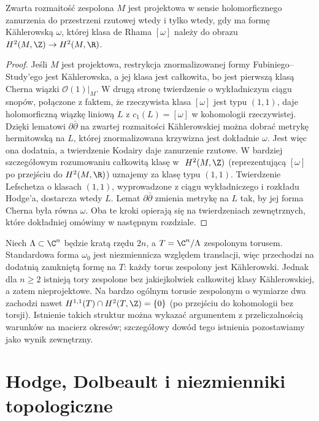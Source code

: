 \begin{wniosek}
\label{wn:ga9-integral-kahler}
Zwarta rozmaitość zespolona $M$ jest projektowa
w sensie holomorficznego zanurzenia do przestrzeni
rzutowej wtedy i tylko wtedy, gdy ma formę Kählerowską
$\omega$, której klasa de Rhama $[\omega]$ należy
do obrazu $H^2(M,\Z)\to H^2(M,\R)$.
\end{wniosek}
\begin{proof}
Jeśli $M$ jest projektowa, restrykcja znormalizowanej
formy Fubiniego--Study'ego jest Kählerowska, a jej
klasa jest całkowita, bo jest pierwszą klasą Cherna
wiązki $\mathcal O(1)|_M$.
W drugą stronę twierdzenie o wykładniczym ciągu snopów,
połączone z faktem, że rzeczywista klasa $[\omega]$
jest typu $(1,1)$, daje holomorficzną wiązkę liniową
$L$ z $c_1(L)=[\omega]$ w kohomologii rzeczywistej.
Dzięki lematowi $\partial\bar\partial$ na zwartej
rozmaitości Kählerowskiej można dobrać metrykę
hermitowską na $L$, której znormalizowana krzywizna
jest dokładnie $\omega$. Jest więc ona dodatnia,
a twierdzenie Kodairy daje zanurzenie rzutowe.
W bardziej szczegółowym rozumowaniu całkowitą klasę w\,~$H^2(M,\Z)$
(reprezentującą $[\omega]$ po przejściu do $H^2(M,\R)$)
uznajemy za klasę typu $(1,1)$. Twierdzenie Lefschetza o klasach
$(1,1)$, wyprowadzone z ciągu wykładniczego i rozkładu Hodge'a,
dostarcza wtedy $L$. Lemat $\partial\bar\partial$ zmienia
metrykę na $L$ tak, by jej forma Cherna była równa $\omega$.
Oba te kroki opierają się na twierdzeniach zewnętrznych,
które dokładniej omówimy w następnym rozdziale.
\end{proof}

\begin{przyklad}
Niech $\Lambda\subset\C^n$ będzie kratą rzędu $2n$,
a $T=\C^n/\Lambda$ zespolonym torusem. Standardowa
forma $\omega_0$ jest niezmiennicza względem translacji,
więc przechodzi na dodatnią zamkniętą formę na $T$:
każdy torus zespolony jest Kählerowski.
Jednak dla $n\ge2$ istnieją tory zespolone bez
jakiejkolwiek całkowitej klasy Kählerowskiej,
a zatem nieprojektowe. Na bardzo ogólnym torusie
zespolonym o wymiarze dwa zachodzi nawet
$H^{1,1}(T)\cap H^2(T,\Z)=\{0\}$ (po przejściu do
kohomologii bez torsji). Istnienie takich struktur
można wykazać argumentem z przeliczalnością warunków
na macierz okresów; szczegółowy dowód tego istnienia
pozostawiamy jako wynik zewnętrzny.
\end{przyklad}

\section{Hodge, Dolbeault i niezmienniki topologiczne}
\label{sec:ga9-hodge}

